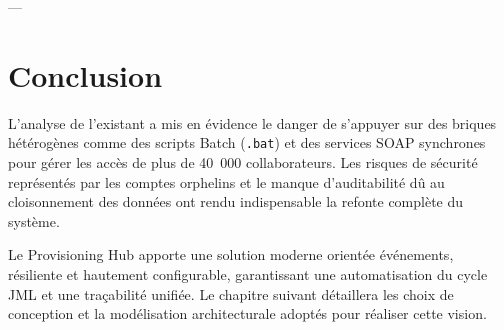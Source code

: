 ---

\section{Conclusion}

L'analyse de l'existant a mis en évidence le danger de s'appuyer sur des briques hétérogènes comme des scripts Batch (\texttt{.bat}) et des services SOAP synchrones pour gérer les accès de plus de 40~000 collaborateurs. Les risques de sécurité représentés par les comptes orphelins et le manque d'auditabilité dû au cloisonnement des données ont rendu indispensable la refonte complète du système. 

Le Provisioning Hub apporte une solution moderne orientée événements, résiliente et hautement configurable, garantissant une automatisation du cycle JML et une traçabilité unifiée. Le chapitre suivant détaillera les choix de conception et la modélisation architecturale adoptés pour réaliser cette vision.
